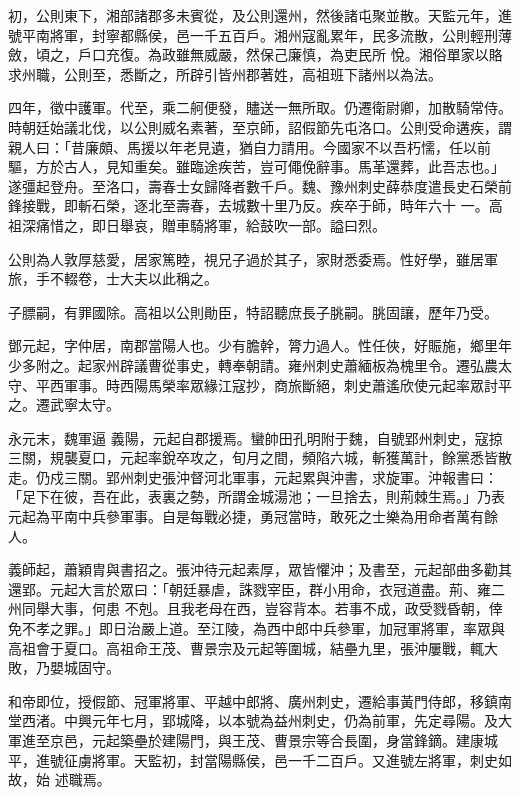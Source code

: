 \begin{pinyinscope}
 初，公則東下，湘部諸郡多未賓從，及公則還州，然後諸屯聚並散。天監元年，進號平南將軍，封寧都縣侯，邑一千五百戶。湘州寇亂累年，民多流散，公則輕刑薄斂，頃之，戶口充復。為政雖無威嚴，然保己廉慎，為吏民所
 悅。湘俗單家以賂求州職，公則至，悉斷之，所辟引皆州郡著姓，高祖班下諸州以為法。



 四年，徵中護軍。代至，乘二舸便發，贐送一無所取。仍遷衛尉卿，加散騎常侍。時朝廷始議北伐，以公則威名素著，至京師，詔假節先屯洛口。公則受命遘疾，謂親人曰：「昔廉頗、馬援以年老見遺，猶自力請用。今國家不以吾朽懦，任以前驅，方於古人，見知重矣。雖臨途疾苦，豈可僶俛辭事。馬革還葬，此吾志也。」遂彊起登舟。至洛口，壽春士女歸降者數千戶。魏、豫州刺史薛恭度遣長史石榮前鋒接戰，即斬石榮，逐北至壽春，去城數十里乃反。疾卒于師，時年六十
 一。高祖深痛惜之，即日舉哀，贈車騎將軍，給鼓吹一部。謚曰烈。



 公則為人敦厚慈愛，居家篤睦，視兄子過於其子，家財悉委焉。性好學，雖居軍旅，手不輟卷，士大夫以此稱之。



 子膘嗣，有罪國除。高祖以公則勛臣，特詔聽庶長子朓嗣。朓固讓，歷年乃受。



 鄧元起，字仲居，南郡當陽人也。少有膽幹，膂力過人。性任俠，好賑施，鄉里年少多附之。起家州辟議曹從事史，轉奉朝請。雍州刺史蕭緬板為槐里令。遷弘農太守、平西軍事。時西陽馬榮率眾緣江寇抄，商旅斷絕，刺史蕭遙欣使元起率眾討平之。遷武寧太守。



 永元末，魏軍逼
 義陽，元起自郡援焉。蠻帥田孔明附于魏，自號郢州刺史，寇掠三關，規襲夏口，元起率銳卒攻之，旬月之間，頻陷六城，斬獲萬計，餘黨悉皆散走。仍戍三關。郢州刺史張沖督河北軍事，元起累與沖書，求旋軍。沖報書曰：「足下在彼，吾在此，表裏之勢，所謂金城湯池；一旦捨去，則荊棘生焉。」乃表元起為平南中兵參軍事。自是每戰必捷，勇冠當時，敢死之士樂為用命者萬有餘人。



 義師起，蕭穎胄與書招之。張沖待元起素厚，眾皆懼沖；及書至，元起部曲多勸其還郢。元起大言於眾曰：「朝廷暴虐，誅戮宰臣，群小用命，衣冠道盡。荊、雍二州同舉大事，何患
 不剋。且我老母在西，豈容背本。若事不成，政受戮昏朝，倖免不孝之罪。」即日治嚴上道。至江陵，為西中郎中兵參軍，加冠軍將軍，率眾與高祖會于夏口。高祖命王茂、曹景宗及元起等圍城，結壘九里，張沖屢戰，輒大敗，乃嬰城固守。



 和帝即位，授假節、冠軍將軍、平越中郎將、廣州刺史，遷給事黃門侍郎，移鎮南堂西渚。中興元年七月，郢城降，以本號為益州刺史，仍為前軍，先定尋陽。及大軍進至京邑，元起築壘於建陽門，與王茂、曹景宗等合長圍，身當鋒鏑。建康城平，進號征虜將軍。天監初，封當陽縣侯，邑一千二百戶。又進號左將軍，刺史如故，始
 述職焉。




\end{pinyinscope}
